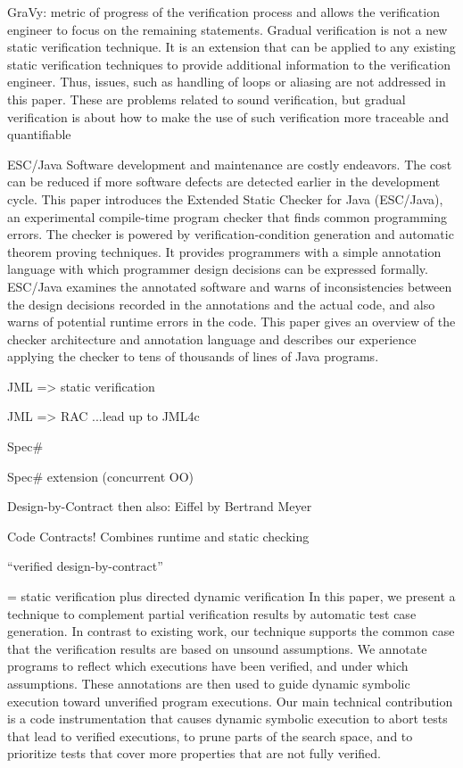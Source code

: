 

\cite{arlt2014gradual}
GraVy:
metric of progress of the verification process
and allows the verification engineer to focus on the remaining statements.
Gradual verification is not a new static verification technique. It is an extension
that can be applied to any existing static verification techniques to provide
additional information to the verification engineer. Thus, issues, such as handling
of loops or aliasing are not addressed in this paper. These are problems
related to sound verification, but gradual verification is about how to make the
use of such verification more traceable and quantifiable

\cite{nelson2004extended} ESC/Java
Software development and maintenance are costly endeavors.
The cost can be reduced if more software defects are
detected earlier in the development cycle. This paper introduces
the Extended Static Checker for Java (ESC/Java),
an experimental compile-time program checker that finds
common programming errors. The checker is powered by
verification-condition generation and automatic theorem proving
techniques. It provides programmers with a simple
annotation language with which programmer design decisions
can be expressed formally. ESC/Java examines the
annotated software and warns of inconsistencies between the
design decisions recorded in the annotations and the actual
code, and also warns of potential runtime errors in the code.
This paper gives an overview of the checker architecture and
annotation language and describes our experience applying
the checker to tens of thousands of lines of Java programs.

\cite{jacobs2001logic} JML => static verification

\cite{cheon2002runtime} JML => RAC
...lead up to
\cite{sarcar2010new} JML4c

\cite{the-spec-programming-system-an-overview} Spec\#

\cite{a-statically-verifiable-programming-model-for-concurrent-object-oriented-programs} Spec\# extension (concurrent OO)

\cite{meyer2002design} Design-by-Contract
then also: Eiffel by Bertrand Meyer 

\cite{embedded-contract-languages} Code Contracts! Combines runtime and static checking

\cite{crocker2004safe} “verified design-by-contract”

\cite{ChristakisMuellerWuestholz16}
= static verification plus directed dynamic verification
In this paper, we present a technique to complement partial
verification results by automatic test case generation. In
contrast to existing work, our technique supports the common
case that the verification results are based on unsound
assumptions. We annotate programs to reflect which executions
have been verified, and under which assumptions.
These annotations are then used to guide dynamic symbolic
execution toward unverified program executions. Our main
technical contribution is a code instrumentation that causes
dynamic symbolic execution to abort tests that lead to verified
executions, to prune parts of the search space, and to
prioritize tests that cover more properties that are not fully
verified.